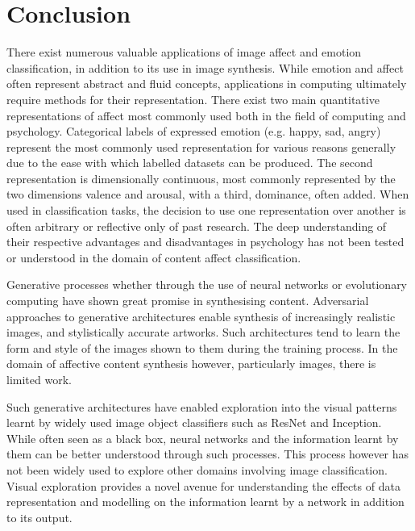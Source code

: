 \documentclass{article}
\begin{document}
\section{Conclusion}

There exist numerous valuable applications of image affect and emotion classification, in addition to its use in image synthesis.
While emotion and affect often represent abstract and fluid concepts, applications in computing ultimately require methods for their representation.
There exist two main quantitative representations of affect most commonly used both in the field of computing and psychology.
Categorical labels of expressed emotion (e.g. happy, sad, angry) represent the most commonly used representation for various reasons generally due to the ease with which labelled datasets can be produced.
The second representation is dimensionally continuous, most commonly represented by the two dimensions valence and arousal, with a third, dominance, often added.
When used in classification tasks, the decision to use one representation over another is often arbitrary or reflective only of past research.
The deep understanding of their respective advantages and disadvantages in psychology has not been tested or understood in the domain of content affect classification.

Generative processes whether through the use of neural networks or evolutionary computing have shown great promise in synthesising content.
Adversarial approaches to generative architectures enable synthesis of increasingly realistic images, and stylistically accurate artworks.
Such architectures tend to learn the form and style of the images shown to them during the training process.
In the domain of affective content synthesis however, particularly images, there is limited work.

Such generative architectures have enabled exploration into the visual patterns learnt by widely used image object classifiers such as ResNet and Inception.
While often seen as a black box, neural networks and the information learnt by them can be better understood through such processes.
This process however has not been widely used to explore other domains involving image classification.
Visual exploration provides a novel avenue for understanding the effects of data representation and modelling on the information learnt by a network in addition to its output.




\end{document}
